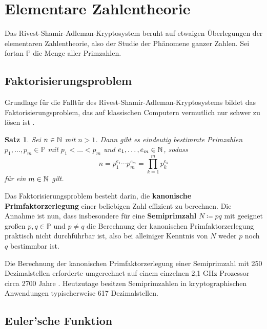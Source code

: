 \documentclass{paper}
\theoremstyle{classic}
\newtheorem{theorem}[definition]{Satz}
\begin{document}
\section{Elementare Zahlentheorie}

Das Rivest-Shamir-Adleman-Kryptosystem beruht auf etwaigen Überlegungen der elementaren Zahlentheorie, also der Studie der Phänomene ganzer Zahlen. Sei fortan \(\mathbb{P}\) die Menge aller Primzahlen.

\subsection{Faktorisierungsproblem}

Grundlage für die Falltür des Rivest-Shamir-Adleman-Kryptosystems bildet das Faktorisierungsproblem, das auf klassischen Computern vermutlich nur schwer zu lösen ist \cite{ifa:2020}.
\begin{theorem}
\label{thm:2.1}
Sei \(n \in \mathbb{N}\) mit \(n > 1\). Dann gibt es eindeutig bestimmte Primzahlen \(p_1,\dots,p_m \in \mathbb{P}\) mit \(p_1 < \dots < p_m\) und \(e_1,\dots,e_m \in \mathbb{N}\), sodass
\[
n = p_1^{e_1} \cdots p_m^{e_m} = \prod_{k=1}^m p_k^{e_k}
\]
für ein \(m \in \mathbb{N}\) gilt.
\end{theorem}
Das Faktorisierungsproblem besteht darin, die \textbf{kanonische Primfaktorzerlegung} einer beliebigen Zahl effizient zu berechnen. Die Annahme ist nun, dass insbesondere für eine \textbf{Semiprimzahl} \(N \coloneqq pq\) mit geeignet großen \(p,q \in \mathbb{P}\) und \(p \neq q\) die Berechnung der kanonischen Primfaktorzerlegung praktisch nicht durchführbar ist, also bei alleiniger Kenntnis von \(N\) weder \(p\) noch \(q\) bestimmbar ist.

Die Berechnung der kanonischen Primfaktorzerlegung einer Semiprimzahl mit 250 Dezimalstellen erforderte umgerechnet auf einem einzelnen 2,1 GHz Prozessor circa 2700 Jahre \cite{rsa:250}. Heutzutage besitzen Semiprimzahlen in kryptographischen Anwendungen typischerweise 617 Dezimalstellen.

\subsection{Euler'sche Funktion}
\end{document}

